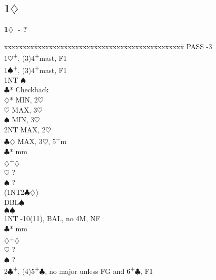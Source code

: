 \documentclass[10pt]{article}
\renewcommand{\c}{$\clubsuit$}
\renewcommand{\d}{$\diamondsuit$}
\newcommand{\h}{$\heartsuit$}
\newcommand{\s}{$\spadesuit$}
\newcommand{\p}{\textsuperscript{+}}
\newcommand{\m}{\textsuperscript{\textminus}}
\newcommand{\x}{DBL}
\newenvironment{bidtable}[1][]
{\textbf{#1}
  \begin{adjustwidth}{1em}{}
    \addvspace{2pt}
    \begin{tabbing}
      xxxxxxxx\=xxxxxxxx\=xxxxxxxx\=xxxxxxxx\=xxxxxxxx\=xxxxxxxx\=\kill}
{\end{tabbing}\end{adjustwidth}\bigskip}%
\newcommand{\pdfd}{\texorpdfstring{\d{}}{D}}
\begin{document}
\begin{multicols*}{2}
\subsection{1\pdfd}

\begin{bidtable}[1\d\ - ?]
PASS      -3                                              \\
1\h       {}\p , (3)4\p mast, F1                            \\
1\s       {}\p , (3)4\p mast, F1                            \\
          \> 1NT        \m\s                              \\
          \>            \c* \> Checkback                  \\
          \>            \>      \d*  \> MIN, 2\m\h        \\
          \>            \>      \h   \> MAX, 3\h          \\
          \>            \>      \s   \> MIN, 3\h          \\
          \>            \>      \> 2NT   \> MAX, 2\m\h        \\
          \>            \>      \c\d \> MAX, 3\h, 5\p m   \\
          \c*       {} mm                              \\
          \d        {}\p\d                              \\
          \h        \> ?                                  \\
          \s        \> ?                                  \\
          \> (1NT2\c\d) \>                                    \\
          \>            \> \x   {}\s                        \\
          \>            \s  {}\s                        \\
1NT       -10(11), BAL, no 4M, NF                         \\
          \c*       {} mm                              \\
          \d        {}\p\d                              \\
          \h        \> ?                                  \\
          \s        \> ?                                  \\
2\c       {}\p, (4)5\p\c, no major unless FG and 6\p\c, F1 \\

\end{bidtable}
\end{multicols*}
\end{document}
